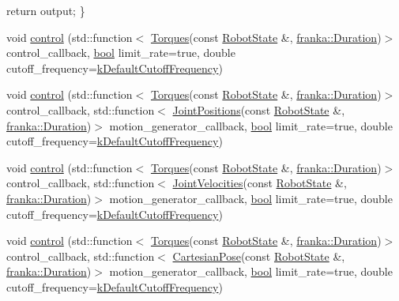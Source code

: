 \begin{Indent}
{\begin{DoxyCode}
  \textcolor{keywordflow}{return} output;
\}
\end{DoxyCode}
 }\begin{DoxyCompactItemize}
\item 
void \hyperlink{classfranka_1_1Robot_a5b5ba0a4f2bfd20be963b05622e629e1}{control} (std\+::function$<$ \hyperlink{classfranka_1_1Torques}{Torques}(const \hyperlink{structfranka_1_1RobotState}{Robot\+State} \&, \hyperlink{classfranka_1_1Duration}{franka\+::\+Duration})$>$ control\+\_\+callback, \hyperlink{classbool}{bool} limit\+\_\+rate=true, double cutoff\+\_\+frequency=\hyperlink{namespacefranka_ad8e3b7da346e03181ab5ac138a4171d4}{k\+Default\+Cutoff\+Frequency})
\item 
void \hyperlink{classfranka_1_1Robot_a5f012ef276eb94d2a98a077bafb49bfe}{control} (std\+::function$<$ \hyperlink{classfranka_1_1Torques}{Torques}(const \hyperlink{structfranka_1_1RobotState}{Robot\+State} \&, \hyperlink{classfranka_1_1Duration}{franka\+::\+Duration})$>$ control\+\_\+callback, std\+::function$<$ \hyperlink{classfranka_1_1JointPositions}{Joint\+Positions}(const \hyperlink{structfranka_1_1RobotState}{Robot\+State} \&, \hyperlink{classfranka_1_1Duration}{franka\+::\+Duration})$>$ motion\+\_\+generator\+\_\+callback, \hyperlink{classbool}{bool} limit\+\_\+rate=true, double cutoff\+\_\+frequency=\hyperlink{namespacefranka_ad8e3b7da346e03181ab5ac138a4171d4}{k\+Default\+Cutoff\+Frequency})
\item 
void \hyperlink{classfranka_1_1Robot_ab16874af2fa32c9ab901683c1666888b}{control} (std\+::function$<$ \hyperlink{classfranka_1_1Torques}{Torques}(const \hyperlink{structfranka_1_1RobotState}{Robot\+State} \&, \hyperlink{classfranka_1_1Duration}{franka\+::\+Duration})$>$ control\+\_\+callback, std\+::function$<$ \hyperlink{classfranka_1_1JointVelocities}{Joint\+Velocities}(const \hyperlink{structfranka_1_1RobotState}{Robot\+State} \&, \hyperlink{classfranka_1_1Duration}{franka\+::\+Duration})$>$ motion\+\_\+generator\+\_\+callback, \hyperlink{classbool}{bool} limit\+\_\+rate=true, double cutoff\+\_\+frequency=\hyperlink{namespacefranka_ad8e3b7da346e03181ab5ac138a4171d4}{k\+Default\+Cutoff\+Frequency})
\item 
void \hyperlink{classfranka_1_1Robot_a368c282fca42f4214864d0d39893fc6e}{control} (std\+::function$<$ \hyperlink{classfranka_1_1Torques}{Torques}(const \hyperlink{structfranka_1_1RobotState}{Robot\+State} \&, \hyperlink{classfranka_1_1Duration}{franka\+::\+Duration})$>$ control\+\_\+callback, std\+::function$<$ \hyperlink{classfranka_1_1CartesianPose}{Cartesian\+Pose}(const \hyperlink{structfranka_1_1RobotState}{Robot\+State} \&, \hyperlink{classfranka_1_1Duration}{franka\+::\+Duration})$>$ motion\+\_\+generator\+\_\+callback, \hyperlink{classbool}{bool} limit\+\_\+rate=true, double cutoff\+\_\+frequency=\hyperlink{namespacefranka_ad8e3b7da346e03181ab5ac138a4171d4}{k\+Default\+Cutoff\+Frequency})

\end{DoxyCompactItemize}
\end{Indent}
